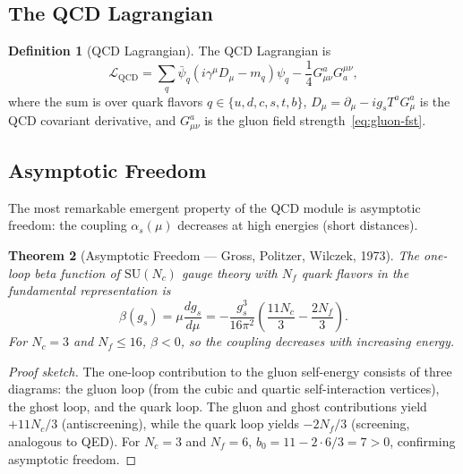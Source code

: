 \documentclass[12pt]{article}
\newtheorem{theorem}{Theorem}[section]
\theoremstyle{definition}
\newtheorem{definition}[theorem]{Definition}
\theoremstyle{remark}
\newcommand{\lag}{\mathcal{L}}
\newcommand{\su}[1]{\mathrm{SU}(#1)}
\newcommand{\dmu}{D_\mu}
\newcommand{\pmu}{\partial_\mu}
\newcommand{\gmu}{\gamma^\mu}
\begin{document}
\subsection{The QCD Lagrangian}

\begin{definition}[QCD Lagrangian]
\label{def:qcd-lag}
The QCD Lagrangian is
\begin{equation}
\label{eq:qcd-lag}
\lag_{\mathrm{QCD}} = \sum_{q} \bar{\psi}_q \left( i \gmu \dmu - m_q \right) \psi_q - \frac{1}{4} G^a_{\mu\nu} G_a^{\mu\nu},
\end{equation}
where the sum is over quark flavors $q \in \{u, d, c, s, t, b\}$, $\dmu = \pmu - i g_s T^a G^a_\mu$ is the QCD covariant derivative, and $G^a_{\mu\nu}$ is the gluon field strength~\eqref{eq:gluon-fst}.
\end{definition}

\subsection{Asymptotic Freedom}

The most remarkable emergent property of the QCD module is asymptotic freedom: the coupling $\alpha_s(\mu)$ decreases at high energies (short distances).

\begin{theorem}[Asymptotic Freedom --- Gross, Politzer, Wilczek, 1973]
\label{thm:asymptotic-freedom}
The one-loop beta function of $\su{N_c}$ gauge theory with $N_f$ quark flavors in the fundamental representation is
\begin{equation}
\label{eq:qcd-beta}
\beta(g_s) = \mu \frac{dg_s}{d\mu} = -\frac{g_s^3}{16\pi^2} \left( \frac{11 N_c}{3} - \frac{2 N_f}{3} \right).
\end{equation}
For $N_c = 3$ and $N_f \leq 16$, $\beta < 0$, so the coupling decreases with increasing energy.
\end{theorem}

\begin{proof}[Proof sketch]
The one-loop contribution to the gluon self-energy consists of three diagrams: the gluon loop (from the cubic and quartic self-interaction vertices), the ghost loop, and the quark loop. The gluon and ghost contributions yield $+11N_c/3$ (antiscreening), while the quark loop yields $-2N_f/3$ (screening, analogous to QED). For $N_c = 3$ and $N_f = 6$, $b_0 = 11 - 2 \cdot 6/3 = 7 > 0$, confirming asymptotic freedom.
\end{proof}
\end{document}
